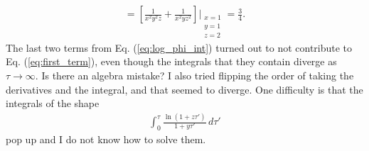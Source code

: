 \documentclass[11pt]{article}
\begin{document}
\begin{align}
    =\left[ \frac{1}{x^2y^2z}+\frac{1}{x^2yz^2}
    \right] \Bigg\vert_{\substack{x=1 \\ y=1 \\ z=2}} = \frac{3}{4}.
\end{align}
The last two terms from Eq. (\ref{eq:log_phi_int}) turned out to not contribute to Eq. (\ref{eq:first_term}), even though the integrals that they contain diverge as $\tau \rightarrow \infty$. Is there an algebra mistake? I also tried flipping the order of taking the derivatives and the integral, and that seemed to diverge. One difficulty is that the integrals of the shape 
\begin{align}
    \int_0^{\tau} \frac{\ln(1+z\tau')}{1+y\tau'} \,d\tau'
\end{align}
pop up and I do not know how to solve them.
\end{document}
